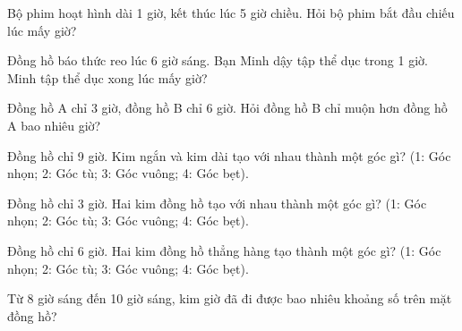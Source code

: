 \begin{ex}
Bộ phim hoạt hình dài 1 giờ, kết thúc lúc 5 giờ chiều. Hỏi bộ phim bắt đầu chiếu lúc mấy giờ?
\end{ex}

\begin{ex}
Đồng hồ báo thức reo lúc 6 giờ sáng. Bạn Minh dậy tập thể dục trong 1 giờ. Minh tập thể dục xong lúc mấy giờ?
\end{ex}

\begin{ex}
Đồng hồ A chỉ 3 giờ, đồng hồ B chỉ 6 giờ. Hỏi đồng hồ B chỉ muộn hơn đồng hồ A bao nhiêu giờ?
\end{ex}

\begin{ex}
Đồng hồ chỉ 9 giờ. Kim ngắn và kim dài tạo với nhau thành một góc gì? (1: Góc nhọn; 2: Góc tù; 3: Góc vuông; 4: Góc bẹt).
\end{ex}

\begin{ex}
Đồng hồ chỉ 3 giờ. Hai kim đồng hồ tạo với nhau thành một góc gì? (1: Góc nhọn; 2: Góc tù; 3: Góc vuông; 4: Góc bẹt).
\end{ex}

\begin{ex}
Đồng hồ chỉ 6 giờ. Hai kim đồng hồ thẳng hàng tạo thành một góc gì? (1: Góc nhọn; 2: Góc tù; 3: Góc vuông; 4: Góc bẹt).
\end{ex}

\begin{ex}
Từ 8 giờ sáng đến 10 giờ sáng, kim giờ đã đi được bao nhiêu khoảng số trên mặt đồng hồ?
\end{ex}
